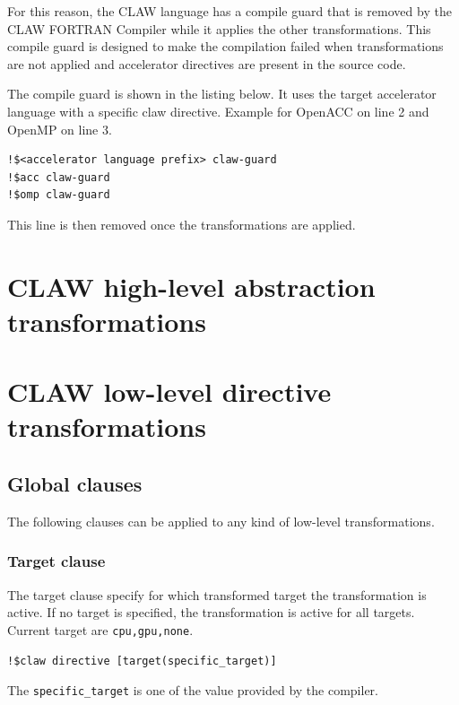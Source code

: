 \documentclass{article}
\begin{document}
For this reason, the CLAW language has a compile guard that is removed by the
CLAW FORTRAN Compiler while it applies the other transformations. This compile
guard is designed to make the compilation failed when transformations are not
applied and accelerator directives are present in the source code.

The compile guard is shown in the listing below. It uses the target accelerator
language with a specific claw directive. Example for OpenACC on line 2 and
OpenMP on line 3.

\begin{lstlisting}
!$<accelerator language prefix> claw-guard
!$acc claw-guard
!$omp claw-guard
\end{lstlisting}

This line is then removed once the transformations are applied.

\section{CLAW high-level abstraction transformations}


\section{CLAW low-level directive transformations}

\subsection{Global clauses}
The following clauses can be applied to any kind of low-level transformations.

\subsubsection{Target clause}
The target clause specify for which transformed target the transformation is
active. If no target is specified, the transformation is active for all targets.
Current target are \lstinline|cpu,gpu,none|.

\begin{lstlisting}
!$claw directive [target(specific_target)]
\end{lstlisting}

The \lstinline|specific_target| is one of the value provided by the compiler.






\appendix

\end{document}
